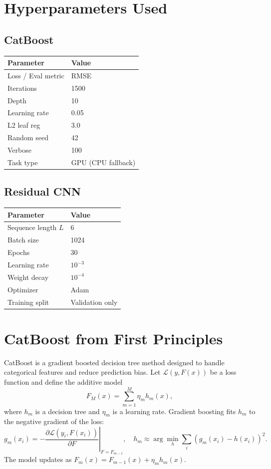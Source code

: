 \documentclass[11pt]{article}
\begin{document}
\section{Hyperparameters Used}

\subsection*{CatBoost}
\begin{center}
\begin{tabular}{ll}
\toprule
Parameter & Value \\
\midrule
Loss / Eval metric & RMSE \\
Iterations & 1500 \\
Depth & 10 \\
Learning rate & 0.05 \\
L2 leaf reg & 3.0 \\
Random seed & 42 \\
Verbose & 100 \\
Task type & GPU (CPU fallback) \\
\bottomrule
\end{tabular}
\end{center}

\subsection*{Residual CNN}
\begin{center}
\begin{tabular}{ll}
\toprule
Parameter & Value \\
\midrule
Sequence length $L$ & 6 \\
Batch size & 1024 \\
Epochs & 30 \\
Learning rate & $10^{-3}$ \\
Weight decay & $10^{-4}$ \\
Optimizer & Adam \\
Training split & Validation only \\
\bottomrule
\end{tabular}
\end{center}

\appendix
\section{CatBoost from First Principles}

CatBoost is a gradient boosted decision tree method designed to handle
categorical features and reduce prediction bias. Let $\mathcal{L}(y, F(x))$ be a
loss function and define the additive model
\[
F_M(x) = \sum_{m=1}^{M} \eta_m h_m(x),
\]
where $h_m$ is a decision tree and $\eta_m$ is a learning rate. Gradient boosting
fits $h_m$ to the negative gradient of the loss:
\[
g_m(x_i) = -\left.\frac{\partial \mathcal{L}(y_i, F(x_i))}{\partial F}\right|_{F=F_{m-1}},
\quad h_m \approx \arg\min_h \sum_i (g_m(x_i) - h(x_i))^2.
\]
The model updates as $F_m(x) = F_{m-1}(x) + \eta_m h_m(x)$.
\end{document}
